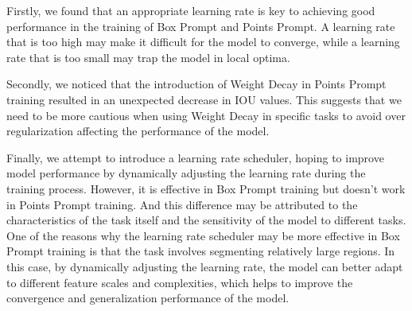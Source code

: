 \documentclass[12pt, a4paper, oneside]{article}
\begin{document}
Firstly, we found that an appropriate learning rate is key to achieving good performance in the training of Box Prompt and Points Prompt. A learning rate that is too high may make it difficult for the model to converge, while a learning rate that is too small may trap the model in local optima.

Secondly, we noticed that the introduction of Weight Decay in Points Prompt training resulted in an unexpected decrease in IOU values. This suggests that we need to be more cautious when using Weight Decay in specific tasks to avoid over regularization affecting the performance of the model.

Finally, we attempt to introduce a learning rate scheduler, hoping to improve model performance by dynamically adjusting the learning rate during the training process. However, it is effective in Box Prompt training but doesn't work in Points Prompt training. And this difference may be attributed to the characteristics of the task itself and the sensitivity of the model to different tasks. One of the reasons why the learning rate scheduler may be more effective in Box Prompt training is that the task involves segmenting relatively large regions. In this case, by dynamically adjusting the learning rate, the model can better adapt to different feature scales and complexities, which helps to improve the convergence and generalization performance of the model.
\newpage




\end{document}
